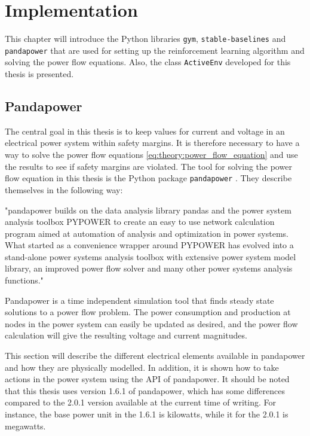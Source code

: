 \documentclass[class=book, crop=false, 11pt]{standalone}
\begin{document}
\chapter{Implementation}

This chapter will introduce the Python libraries \texttt{gym}, \texttt{stable-baselines} and \texttt{pandapower} that are used for setting up the reinforcement learning algorithm and solving the power flow equations. Also, the class \texttt{ActiveEnv} developed for this thesis is presented. 


\section{Pandapower}
The central goal in this thesis is to keep values for current and voltage in an electrical power system within safety margins. It is therefore necessary to have a way to solve the power flow equations \eqref{eq:theory:power_flow_equation} and use the results to see if safety margins are violated. The tool for solving the power flow equation in this thesis is the Python package \texttt{pandapower} \cite{pandapower}. They describe themselves in the following way:

\begin{displayquote}
"pandapower builds on the data analysis library pandas and the power system analysis toolbox PYPOWER to create an easy to use network calculation program aimed at automation of analysis and optimization in power systems. What started as a convenience wrapper around PYPOWER has evolved into a stand-alone power systems analysis toolbox with extensive power system model library, an improved power flow solver and many other power systems analysis functions." \cite{pandapower_website}
\end{displayquote}

Pandapower is a time independent simulation tool that finds steady state solutions to a power flow problem. The power consumption and production at nodes in the power system can easily be updated as desired, and the power flow calculation will give the resulting voltage and current magnitudes.

This section will describe the different electrical elements available in pandapower and how they are physically modelled. In addition, it is shown how to take actions in the power system using the API of pandapower. It should be noted that this thesis uses version 1.6.1 of pandapower, which has some differences compared to the 2.0.1 version available at the current time of writing. For instance, the base power unit in the 1.6.1 is kilowatts, while it for the 2.0.1 is megawatts.
\end{document}
